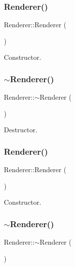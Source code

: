 \subsubsection{\texorpdfstring{Renderer()}{Renderer()}\hspace{0.1cm}{\footnotesize\ttfamily [1/2]}}
{\footnotesize\ttfamily Renderer\+::\+Renderer (\begin{DoxyParamCaption}{ }\end{DoxyParamCaption})}

Constructor. \mbox{\label{classRenderer_afeee408862d5bd6255a6882d47e6d5cd}} 
\subsubsection{\texorpdfstring{$\sim$\+Renderer()}{~Renderer()}\hspace{0.1cm}{\footnotesize\ttfamily [1/2]}}
{\footnotesize\ttfamily Renderer\+::$\sim$\+Renderer (\begin{DoxyParamCaption}{ }\end{DoxyParamCaption})}

Destructor. \mbox{\label{classRenderer_a7ebf46f54dab9905f79b80f7fddb76a6}} 
\subsubsection{\texorpdfstring{Renderer()}{Renderer()}\hspace{0.1cm}{\footnotesize\ttfamily [2/2]}}
{\footnotesize\ttfamily Renderer\+::\+Renderer (\begin{DoxyParamCaption}{ }\end{DoxyParamCaption})}

Constructor. \mbox{\label{classRenderer_afeee408862d5bd6255a6882d47e6d5cd}} 
\subsubsection{\texorpdfstring{$\sim$\+Renderer()}{~Renderer()}\hspace{0.1cm}{\footnotesize\ttfamily [2/2]}}
{\footnotesize\ttfamily Renderer\+::$\sim$\+Renderer (\begin{DoxyParamCaption}{ }\end{DoxyParamCaption})}

